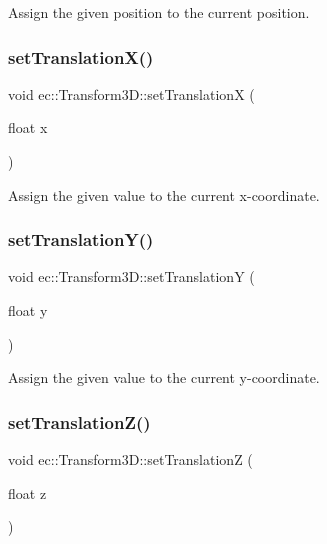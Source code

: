 Assign the given position to the current position. \mbox{\label{classec_1_1_transform3_d_a51d65455864ed3595a53c40d2f576067}} 
\subsubsection{\texorpdfstring{set\+Translation\+X()}{setTranslationX()}}
{\footnotesize\ttfamily void ec\+::\+Transform3\+D\+::set\+TranslationX (\begin{DoxyParamCaption}\item[{float}]{x }\end{DoxyParamCaption})}

Assign the given value to the current x-\/coordinate. \mbox{\label{classec_1_1_transform3_d_aa9d5eab59374d5e900c17c02a4c64b2f}} 
\subsubsection{\texorpdfstring{set\+Translation\+Y()}{setTranslationY()}}
{\footnotesize\ttfamily void ec\+::\+Transform3\+D\+::set\+TranslationY (\begin{DoxyParamCaption}\item[{float}]{y }\end{DoxyParamCaption})}

Assign the given value to the current y-\/coordinate. \mbox{\label{classec_1_1_transform3_d_aeddca7f4f74afd8394810222684fad30}} 
\subsubsection{\texorpdfstring{set\+Translation\+Z()}{setTranslationZ()}}
{\footnotesize\ttfamily void ec\+::\+Transform3\+D\+::set\+TranslationZ (\begin{DoxyParamCaption}\item[{float}]{z }\end{DoxyParamCaption})}

